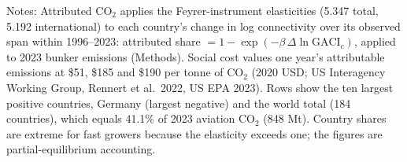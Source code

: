 \documentclass[12pt]{extarticle}
\begin{document}
\begin{table}[H]
{\begin{threeparttable}
\begin{tabular}{lcccccc}
\bottomrule
\end{tabular}
\begin{tablenotes}[flushleft]
\footnotesize
\item Notes: Attributed CO$_2$ applies the Feyrer-instrument elasticities (5.347 total, 5.192 international) to each country's change in log connectivity over its observed span within 1996--2023: attributed share $= 1-\exp(-\beta\,\Delta\ln\mathrm{GACI}_c)$, applied to 2023 bunker emissions (Methods). Social cost values one year's attributable emissions at \$51, \$185 and \$190 per tonne of CO$_2$ (2020 USD; US Interagency Working Group, Rennert et al.\ 2022, US EPA 2023). Rows show the ten largest positive countries, Germany (largest negative) and the world total (184 countries), which equals 41.1\% of 2023 aviation CO$_2$ (848 Mt). Country shares are extreme for fast growers because the elasticity exceeds one; the figures are partial-equilibrium accounting.
\end{tablenotes}
\end{threeparttable}}
\end{table}

\begin{table}[H]
\centering
{}
\end{table}
\end{document}
